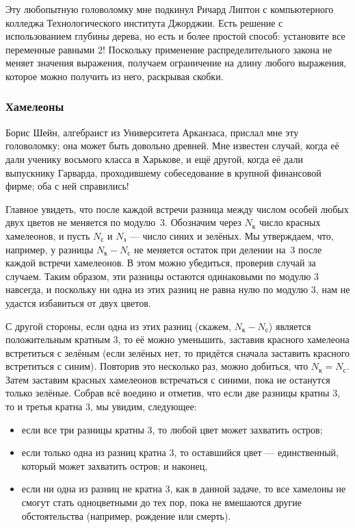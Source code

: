 Эту любопытную головоломку мне подкинул Ричард Липтон с компьютерного колледжа Технологического института Джорджии.
Есть решение с использованием глубины дерева, но есть и более простой способ:
установите все переменные равными 2!
Поскольку применение распределительного закона не меняет значения выражения, получаем ограничение на длину любого выражения, которое можно получить из него, раскрывая скобки.

\subsubsection*{Хамелеоны}

Борис Шейн, алгебраист из Университета Арканзаса, прислал мне эту головоломку; она может быть довольно древней.
Мне известен случай, когда её дали ученику восьмого класса в Харькове,
и ещё другой, когда её дали выпускнику Гарварда, проходившему собеседование в крупной финансовой фирме;
оба с ней справились!

Главное увидеть, что после каждой встречи разница между числом особей любых двух цветов не меняется по модулю~3.
Обозначим через $N_{\text{к}}$ число красных хамелеонов, и пусть
$N_{\text{с}}$ и $N_{\text{з}}$ --- число синих и зелёных.
Мы утверждаем, что, например, у разницы $N_{\text{к}} - N_{\text{с}}$ не меняется остаток при делении на~$3$ после каждой встречи хамелеонов.
В этом можно убедиться, проверив случай за случаем.
Таким образом, эти разницы остаются одинаковыми по модулю 3 навсегда, и поскольку ни одна из этих разниц не равна нулю по модулю 3, нам не удастся избавиться от двух цветов.

С другой стороны, если одна из этих разниц (скажем, $N_{\text{к}} - N_{\text{с}}$) является положительным кратным $3$, то её можно уменьшить, заставив красного хамелеона встретиться с зелёным (если зелёных нет, то придётся сначала заставить красного встретиться с синим).
Повторив это несколько раз, можно добиться, что $N_{\text{к}} = N_{\text{с}}$.
Затем заставим красных хамелеонов встречаться с синими, пока не останутся только зелёные.
Собрав всё воедино и отметив, что если две разницы кратны $3$, то и третья кратна $3$, мы увидим, следующее:
\begin{itemize}
\item если все три разницы кратны 3, то любой цвет может захватить остров;
\item если только одна из разниц кратна 3, то оставшийся цвет --- единственный, который может захватить остров; и наконец,
\item если ни одна из разниц не кратна 3, как в данной задаче, то все хамелоны не смогут стать одноцветными до тех пор, пока не вмешаются другие обстоятельства (например, рождение или смерть).
\end{itemize}

